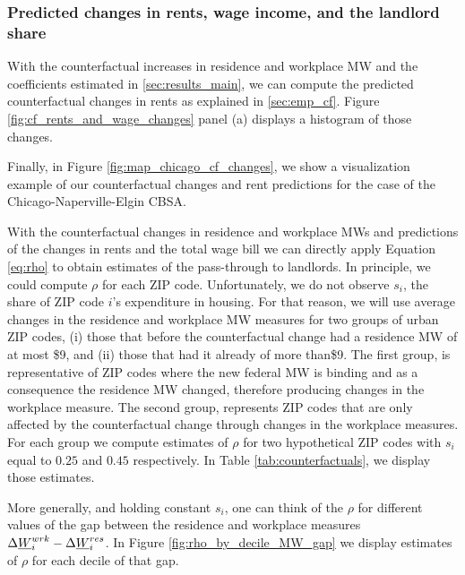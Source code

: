 \subsubsection*{Predicted changes in rents, wage income, and the landlord share}
\label{sec:cf_rents_and_wage_changes}

With the counterfactual increases in residence and workplace MW and the 
coefficients estimated in \ref{sec:results_main}, we can compute the predicted 
counterfactual changes in rents as explained in \ref{sec:emp_cf}.
Figure \ref{fig:cf_rents_and_wage_changes} panel (a) displays a histogram of 
those changes. 



Finally, in Figure \ref{fig:map_chicago_cf_changes}, we show a visualization example 
of our counterfactual changes and rent predictions for the case of the 
Chicago-Naperville-Elgin CBSA. 


With the counterfactual changes in residence and workplace MWs and predictions of 
the changes in rents and the total wage bill we can directly apply Equation \ref{eq:rho} 
to obtain estimates of the pass-through to landlords. In principle, we could compute $\rho$ 
for each ZIP code. Unfortunately, we do not observe $s_i$, the share of ZIP code $i$'s 
expenditure in housing. For that reason, we will use average changes in the residence and 
workplace MW measures for two groups of urban ZIP codes, (i) those that before the counterfactual 
change had a residence MW of at most \$9, and (ii) those that had it already of more than\$9. The 
first group, is representative of ZIP codes where the new federal MW is binding and as a consequence 
the residence MW changed, therefore producing changes in the workplace measure. The second group, 
represents ZIP codes that are only affected by the counterfactual change through changes in the 
workplace measures.
For each group we compute estimates of $\rho$ for two hypothetical ZIP codes with $s_i$ equal to 
$0.25$ and $0.45$ respectively. In Table \ref{tab:counterfactuals}, we display those estimates.


More generally, and holding constant $s_i$, one can think of the $\rho$ for different values
of the gap between the residence and workplace measures $\Delta \underline{W}_i^{wrk} - \Delta \underline{W}_i^{res}$.
In Figure \ref{fig:rho_by_decile_MW_gap} we display estimates of $\rho$ for each decile of that gap.



